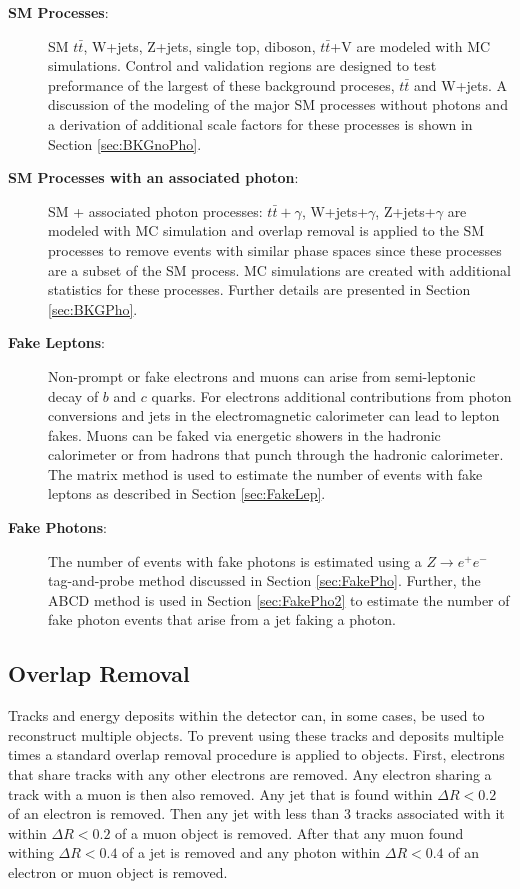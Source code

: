 \begin{description}
\item[\textbf{SM Processes}:]  SM $t\bar{t}$, W+jets, Z+jets, single top, diboson, $t\bar{t}$+V are modeled with MC simulations.  Control and validation regions are designed to test preformance of the largest of these background proceses, $t\bar{t}$ and W+jets.  A discussion of the modeling of the major SM processes without photons and a derivation of additional scale factors for these processes is shown in Section \ref{sec:BKGnoPho}.

\item[\textbf{SM Processes with an associated photon}:] SM + associated photon processes: $t\bar{t}+\gamma$, W+jets+$\gamma$, Z+jets+$\gamma$ are modeled with MC simulation and overlap removal is applied to the SM processes to remove events with similar phase spaces since these processes are a subset of the SM process.  MC simulations are created with additional statistics for these processes.  Further details are presented in Section \ref{sec:BKGPho}.

\item[\textbf{Fake Leptons}:] Non-prompt or fake electrons and muons can arise from semi-leptonic decay of $b$ and $c$ quarks.  For electrons additional contributions from photon conversions and jets in the electromagnetic calorimeter can lead to lepton fakes.  Muons can be faked via energetic showers in the hadronic calorimeter or from hadrons that punch through the hadronic calorimeter.  The matrix method is used to estimate the number of events with fake leptons as described in Section \ref{sec:FakeLep}.

\item[\textbf{Fake Photons}:] The number of events with fake photons is estimated using a $Z\rightarrow e^+ e^-$ tag-and-probe method discussed in Section \ref{sec:FakePho}.  Further, the ABCD method is used in Section \ref{sec:FakePho2} to estimate the number of fake photon events that arise from a jet faking a photon.

\end{description}
\subsection{Overlap Removal}
\label{sec:OverlapRemoval}
Tracks and energy deposits within the detector can, in some cases, be used to reconstruct multiple objects.  To prevent using these tracks and deposits multiple times a standard overlap removal procedure is applied to objects.  First, electrons that share tracks with any other electrons are removed.  Any electron sharing a track with a muon is then also removed.  Any jet that is found within  $\Delta R < 0.2$ of an electron is removed.  Then any jet with less than 3 tracks associated with it within $\Delta R < 0.2$ of a muon object is removed.  After that any muon found withing $\Delta R < 0.4$ of a jet is removed and any photon within $\Delta R < 0.4$ of an electron or muon object is removed. %

